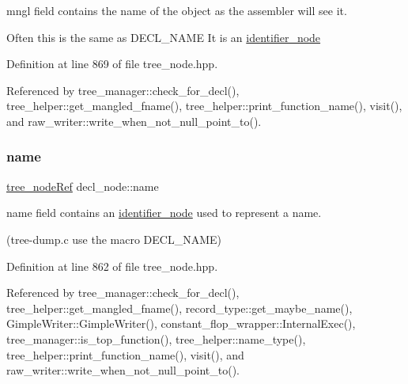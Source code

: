 mngl field contains the name of the object as the assembler will see it. 

Often this is the same as D\+E\+C\+L\+\_\+\+N\+A\+ME It is an \hyperlink{structidentifier__node}{identifier\+\_\+node} 

Definition at line 869 of file tree\+\_\+node.\+hpp.



Referenced by tree\+\_\+manager\+::check\+\_\+for\+\_\+decl(), tree\+\_\+helper\+::get\+\_\+mangled\+\_\+fname(), tree\+\_\+helper\+::print\+\_\+function\+\_\+name(), visit(), and raw\+\_\+writer\+::write\+\_\+when\+\_\+not\+\_\+null\+\_\+point\+\_\+to().

\mbox{\label{structdecl__node_a006b2ff345da98bd3c288526bfa633f4}} 
\subsubsection{\texorpdfstring{name}{name}}
{\footnotesize\ttfamily \hyperlink{tree__node_8hpp_a6ee377554d1c4871ad66a337eaa67fd5}{tree\+\_\+node\+Ref} decl\+\_\+node\+::name}



name field contains an \hyperlink{structidentifier__node}{identifier\+\_\+node} used to represent a name. 

(tree-\/dump.\+c use the macro D\+E\+C\+L\+\_\+\+N\+A\+ME) 

Definition at line 862 of file tree\+\_\+node.\+hpp.



Referenced by tree\+\_\+manager\+::check\+\_\+for\+\_\+decl(), tree\+\_\+helper\+::get\+\_\+mangled\+\_\+fname(), record\+\_\+type\+::get\+\_\+maybe\+\_\+name(), Gimple\+Writer\+::\+Gimple\+Writer(), constant\+\_\+flop\+\_\+wrapper\+::\+Internal\+Exec(), tree\+\_\+manager\+::is\+\_\+top\+\_\+function(), tree\+\_\+helper\+::name\+\_\+type(), tree\+\_\+helper\+::print\+\_\+function\+\_\+name(), visit(), and raw\+\_\+writer\+::write\+\_\+when\+\_\+not\+\_\+null\+\_\+point\+\_\+to().

\mbox{\label{structdecl__node_a93a4d05434b7bdb6074264ccafd622ce}} 
